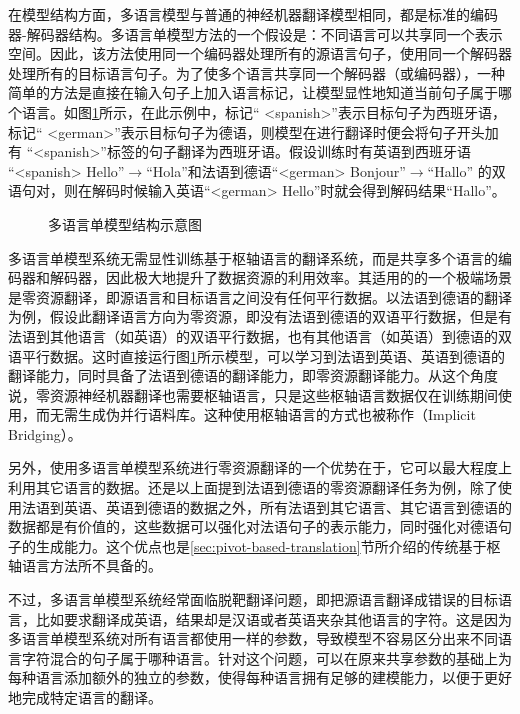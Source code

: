 \parinterval 在模型结构方面，多语言模型与普通的神经机器翻译模型相同，都是标准的编码器-解码器结构。多语言单模型方法的一个假设是：不同语言可以共享同一个表示空间。因此，该方法使用同一个编码器处理所有的源语言句子，使用同一个解码器处理所有的目标语言句子。为了使多个语言共享同一个解码器（或编码器），一种简单的方法是直接在输入句子上加入语言标记，让模型显性地知道当前句子属于哪个语言。如图\ref{fig:16-15}所示，在此示例中，标记“ <spanish>”表示目标句子为西班牙语，标记“ <german>”表示目标句子为德语，则模型在进行翻译时便会将句子开头加有 “<spanish>”标签的句子翻译为西班牙语。假设训练时有英语到西班牙语 “<spanish> Hello”$\to$“Hola”和法语到德语“<german> Bonjour”$\to$“Hallo” 的双语句对，则在解码时候输入英语“<german> Hello”时就会得到解码结果“Hallo”。
\begin{figure}[h]
\centering

\caption{多语言单模型结构示意图}
\label{fig:16-15}
\end{figure}

\parinterval 多语言单模型系统无需显性训练基于枢轴语言的翻译系统，而是共享多个语言的编码器和解码器，因此极大地提升了数据资源的利用效率。其适用的的一个极端场景是零资源翻译，即源语言和目标语言之间没有任何平行数据。以法语到德语的翻译为例，假设此翻译语言方向为零资源，即没有法语到德语的双语平行数据，但是有法语到其他语言（如英语）的双语平行数据，也有其他语言（如英语）到德语的双语平行数据。这时直接运行图\ref{fig:16-15}所示模型，可以学习到法语到英语、英语到德语的翻译能力，同时具备了法语到德语的翻译能力，即零资源翻译能力。从这个角度说，零资源神经机器翻译也需要枢轴语言，只是这些枢轴语言数据仅在训练期间使用，而无需生成伪并行语料库。这种使用枢轴语言的方式也被称作{\small{}}（Implicit Bridging）。

\parinterval 另外，使用多语言单模型系统进行零资源翻译的一个优势在于，它可以最大程度上利用其它语言的数据。还是以上面提到法语到德语的零资源翻译任务为例，除了使用法语到英语、英语到德语的数据之外，所有法语到其它语言、其它语言到德语的数据都是有价值的，这些数据可以强化对法语句子的表示能力，同时强化对德语句子的生成能力。这个优点也是\ref{sec:pivot-based-translation}节所介绍的传统基于枢轴语言方法所不具备的。

\parinterval 不过，多语言单模型系统经常面临脱靶翻译问题，即把源语言翻译成错误的目标语言，比如要求翻译成英语，结果却是汉语或者英语夹杂其他语言的字符。这是因为多语言单模型系统对所有语言都使用一样的参数，导致模型不容易区分出来不同语言字符混合的句子属于哪种语言。针对这个问题，可以在原来共享参数的基础上为每种语言添加额外的独立的参数，使得每种语言拥有足够的建模能力，以便于更好地完成特定语言的翻译。

